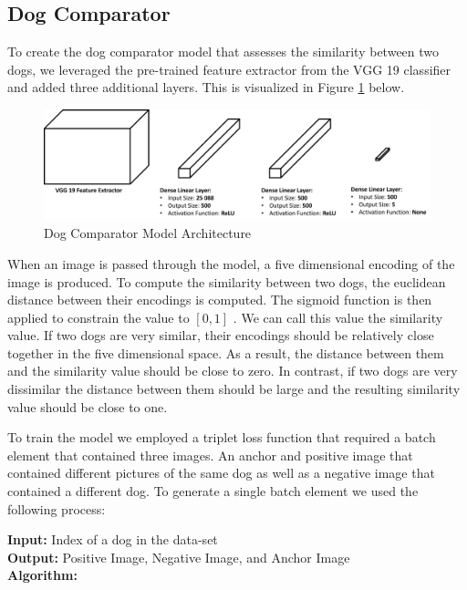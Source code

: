 \documentclass{article}
\begin{document}
\subsection{Dog Comparator}
To create the dog comparator model that assesses the similarity between two dogs, we leveraged the pre-trained feature extractor from the VGG 19 classifier \cite{SimonyanKaren2014VDCN} and added three additional layers.  This is visualized in Figure \ref{fig:x comparator} below.

\begin{figure}[h]
\centering
	\includegraphics[scale=0.4]{final-report-images/dog_comparator.png}
\caption{Dog Comparator Model Architecture}
\label{fig:x comparator}
\end{figure}

\noindent When an image is passed through the model, a five dimensional encoding of the image is produced.  To compute the similarity between two dogs, the euclidean distance between their encodings is computed.  The sigmoid function is then applied to constrain the value to $[0,1]$ .  We can call this value the similarity value.  If two dogs are very similar, their encodings should be relatively close together in the five dimensional space.  As a result, the distance between them and the similarity value should be close to zero.  In contrast, if two dogs are very dissimilar the distance between them should be large and the resulting similarity value should be close to one.  

To train the model we employed a triplet loss function that required a batch element that contained three images.  An anchor and positive image that contained different pictures of the same dog as well as a negative image that contained a different dog.  To generate a single batch element we used the following process: \\

    \begin{minipage}{1\textwidth}%
      \noindent \textbf{Input:} Index of a dog in the data-set \\
      
      \noindent \textbf{Output:} Positive Image, Negative Image, and Anchor Image \\
      
      \noindent \textbf{Algorithm:} \\
    \end{minipage}%
    
\end{document}
